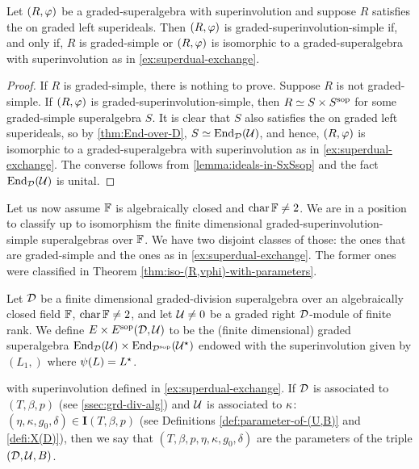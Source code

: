 \begin{cor}\label{cor:SxSsop-with-dcc}
    Let $(R, \varphi)$ be a graded-superalgebra with superinvolution and suppose $R$ satisfies the \dcc{} on graded left superideals. 
    Then $(R, \varphi)$ is graded-superinvolution-simple if, and only if, $R$ is graded-simple or $(R, \varphi)$ is isomorphic to a graded-superalgebra with superinvolution as in \cref{ex:superdual-exchange}. 
\end{cor}

\begin{proof}
    If $R$ is graded-simple, there is nothing to prove. 
    Suppose $R$ is not graded-simple. 
    If $(R, \varphi)$ is graded-superinvolution-simple, then $R \simeq S\times S^{\mathrm{sop}}$ for some graded-simple superalgebra $S$. 
    It is clear that $S$ also satisfies the \dcc{} on graded left superideals, so by \cref{thm:End-over-D}, $S \simeq \operatorname{End}_{\mathcal{D}} (\mathcal U)$, and hence, $(R, \varphi)$
    is isomorphic to a graded-superalgebra with superinvolution as in \cref{ex:superdual-exchange}. 
    The converse follows from \cref{lemma:ideals-in-SxSsop} and the fact $\operatorname{End}_{\mathcal{D}} (\mathcal U)$ is unital. 
\end{proof}

Let us now assume $\mathbb{F}$ is algebraically closed and $\operatorname{char} \mathbb{F} \neq 2$. 
We are in a position to classify up to isomorphism the finite dimensional graded-superinvolution-simple  superalgebras over $\mathbb{F}$. 
We have two disjoint classes of those: the ones that are graded-simple and the ones as in \cref{ex:superdual-exchange}. 
The former ones were classified in Theorem \ref{thm:iso-(R,vphi)-with-parameters}. 

\begin{defi}
    Let $\mathcal{D}$ be a finite dimensional graded-division superalgebra over an algebraically closed field $\mathbb{F}$, $\operatorname{char} \mathbb{F} \neq 2$, and let $\mathcal U\neq 0$ be a graded right $\mathcal{D}$-module of finite rank. 
	We define $E\times E^{\mathrm{sop}}(\mathcal{D}, \mathcal U)$ to be the (finite dimensional) graded superalgebra $\operatorname{End}_{\mathcal{D}}(\mathcal U) \times \operatorname{End}_{\mathcal{D}^{\mathrm{sop}}}(\mathcal U^\star)$ endowed with the superinvolution given by $(L_1, )$ where $\psi(L) = L^\star$.
	
	with superinvolution defined in \cref{ex:superdual-exchange}.
	If $\mathcal{D}$ is associated to $(T, \beta, p)$ (see \cref{ssec:grd-div-alg}) and $\mathcal U$ is associated to $\kappa\colon $ $(\eta, \kappa, g_0, \delta) \in \mathbf{I}(T, \beta, p)$ (see Definitions \ref{def:parameter-of-(U,B)} and \ref{defi:X(D)}), then we say that $(T, \beta, p, \eta, \kappa, g_0, \delta)$ are the parameters of the triple $(\mathcal{D}, \mathcal U, B)$.
\end{defi}

